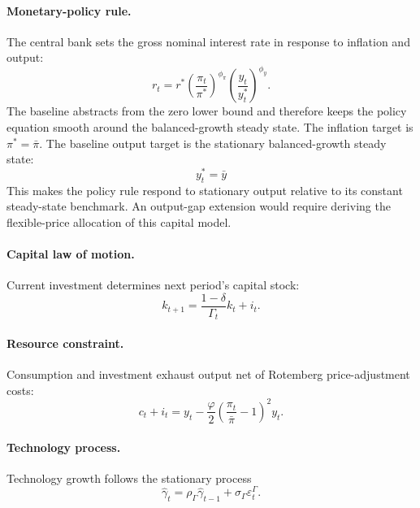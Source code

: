 \documentclass[12pt,final]{article}
\begin{document}
\paragraph{Monetary-policy rule.}
The central bank sets the gross nominal interest rate in response to inflation
and output:
\begin{equation}
  r_t
  =r^*\left(\frac{\pi_t}{\pi^*}\right)^{\phi_\pi}
  \left(\frac{y_t}{y_t^*}\right)^{\phi_y}.
  \label{eq:policy-rule}
\end{equation}
The baseline abstracts from the zero lower bound and therefore keeps the policy
equation smooth around the balanced-growth steady state.
The inflation target is $\pi^*=\bar\pi$.  The baseline output target is the
stationary balanced-growth steady state:
\begin{equation}
  y_t^*=\bar y
  \label{eq:ss-output-target}
\end{equation}
This makes the policy rule respond to stationary output relative to its constant
steady-state benchmark.  An output-gap extension would require deriving the
flexible-price allocation of this capital model.

\paragraph{Capital law of motion.}
Current investment determines next period's capital stock:
\begin{equation}
  k_{t+1}=\frac{1-\delta}{\Gamma_t}k_t+i_t.
  \label{eq:capital-block}
\end{equation}

\paragraph{Resource constraint.}
Consumption and investment exhaust output net of Rotemberg price-adjustment costs:
\begin{equation}
  c_t+i_t
  =y_t-
  \frac{\varphi}{2}
  \left(\frac{\pi_t}{\bar\pi}-1\right)^2y_t.
  \label{eq:resource-direct}
\end{equation}

\paragraph{Technology process.}
Technology growth follows the stationary process
\begin{equation}
  \widehat\gamma_t
  =\rho_\Gamma\widehat\gamma_{t-1}
  +\sigma_\Gamma\varepsilon_t^\Gamma.
  \label{eq:technology-block}
\end{equation}
\end{document}
